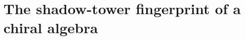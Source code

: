 %
%
%
%
%

\chapter{The shadow-tower fingerprint of a chiral algebra}
\label{ch:part-ii-platonic-introduction}

